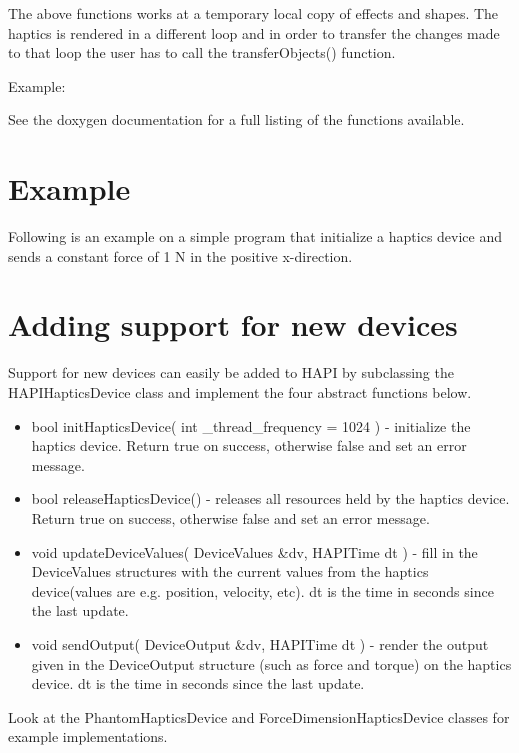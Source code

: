 The above functions works at a temporary local copy of effects and
shapes. The haptics is rendered in a different loop and in order to
transfer the changes made to that loop the user has to call the
transferObjects() function. 

Example:



See the doxygen documentation for a full listing of the functions
available. 

\section{Example}
Following is an example on a simple program that initialize a haptics
device and sends a constant force of 1 N in the positive x-direction.

 

\section{Adding support for new devices}
\label{ssAddingHapticsSupport}

Support for new devices can easily be added to HAPI by subclassing the
HAPIHapticsDevice class and implement the four abstract functions below.

\begin{itemize}
\item bool initHapticsDevice( int \_thread\_frequency = 1024 ) - initialize the haptics device. Return
  true on success, otherwise false and set an error message. 
\item bool releaseHapticsDevice() - releases all resources held by the
  haptics device. Return true on success, otherwise false and set an
  error message. 
\item void updateDeviceValues( DeviceValues \&dv, HAPITime dt ) - fill
  in the DeviceValues structures with the current values from the
  haptics device(values are e.g. position, velocity, etc). dt is the
  time in seconds since the last update.
\item void sendOutput( DeviceOutput \&dv, HAPITime dt ) - render the
  output given in the DeviceOutput structure (such as force and torque)
  on the haptics device. dt is the time in seconds since the last update.
\end{itemize}

Look at the PhantomHapticsDevice and ForceDimensionHapticsDevice classes for
example implementations. 

